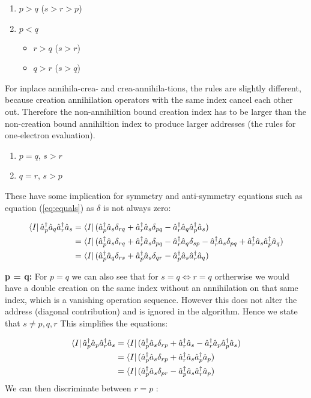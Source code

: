 \begin{enumerate}
  \item $p > q$ ($s > r > p$)
  \item $p < q$
  \begin{itemize}
    \item $r > q$ ($s > r$)
    \item $q > r$ ($s > q$)
  \end{itemize}
\end{enumerate}
For inplace annihila-crea- and crea-annihila-tions, the rules are slightly different, because creation annihilation operators with the same index cancel each other out. Therefore the non-annihiltion bound creation index has to be larger than the non-creation bound annihiltion index to produce larger addresses (the rules for one-electron evaluation).

\begin{enumerate}
  \item $p = q$, $s > r$
  \item $q = r$, $s > p$
\end{enumerate}
These have some implication for symmetry and anti-symmetry equations such as equation (\ref{eq:equals}) as $\delta$ is not always zero:


\begin{align}
   \bra{I}  \hat{a}^\dagger_p \hat{a}_q \hat{a}^\dagger_r \hat{a}_s & =   \bra{I} (\hat{a}^\dagger_p \hat{a}_s \delta_{rq} + \hat{a}^\dagger_r  \hat{a}_s \delta_{pq} - \hat{a}^\dagger_r \hat{a}_q \hat{a}^\dagger_p \hat{a}_s) \\
  & =   \bra{I} (\hat{a}^\dagger_p \hat{a}_s \delta_{rq} + \hat{a}^\dagger_r \hat{a}_s \delta_{pq} - \hat{a}^\dagger_r \hat{a}_q  \delta_{sp} - \hat{a}^\dagger_r \hat{a}_s \delta_{pq} + \hat{a}^\dagger_r \hat{a}_s \hat{a}^\dagger_p \hat{a}_q) \\
  & =   \bra{I} (\hat{a}^\dagger_p \hat{a}_q \delta_{rs} + \hat{a}^\dagger_p \hat{a}_s \delta_{qr} - \hat{a}^\dagger_p \hat{a}_s \hat{a}^\dagger_r \hat{a}_q)
\end{align}

\textbf{p = q:}
For $p = q$ we can also see that for $s = q \iff r = q$ ortherwise we would have a double creation on the same index without an annihilation on that same index, which is a vanishing operation sequence. However this does not alter the address (diagonal contribution) and is ignored in the algorithm. Hence we state that $ s \neq p, q, r $ This simplifies the equations:

\begin{align}
  \bra{I}  \hat{a}^\dagger_p \hat{a}_p \hat{a}^\dagger_r \hat{a}_s & =  \bra{I} (\hat{a}^\dagger_p \hat{a}_s \delta_{rp} + \hat{a}^\dagger_r  \hat{a}_s - \hat{a}^\dagger_r \hat{a}_p \hat{a}^\dagger_p \hat{a}_s) \\
  & =   \bra{I} (\hat{a}^\dagger_p \hat{a}_s \delta_{rp} + \hat{a}^\dagger_r \hat{a}_s \hat{a}^\dagger_p \hat{a}_p) \\
  & =   \bra{I} (\hat{a}^\dagger_p \hat{a}_s \delta_{pr} - \hat{a}^\dagger_p \hat{a}_s \hat{a}^\dagger_r \hat{a}_p)
\end{align}
We can then discriminate between $r = p$ :

